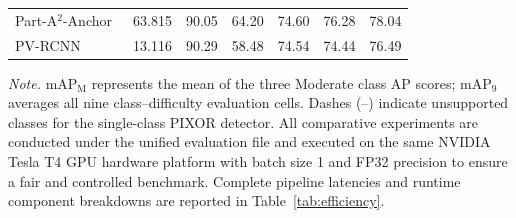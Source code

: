 \begin{table}[t]
\begin{tabular}{@{}lrrrrrr@{}}
Part-A$^2$-Anchor~\cite{shi2020part} & 63.815 & 90.05 & 64.20 & 74.60 & 76.28 & 78.04 \\
PV-RCNN~\cite{shi2020pvrcnn} & 13.116 & 90.29 & 58.48 & 74.54 & 74.44 & 76.49 \\
\bottomrule
\end{tabular}
\par\vspace{2pt}
{\footnotesize \textit{Note.} $\text{mAP}_{\mathrm{M}}$ represents the mean of the three Moderate class AP scores; $\text{mAP}_{9}$ averages all nine class--difficulty evaluation cells. Dashes (--) indicate unsupported classes for the single-class PIXOR detector. All comparative experiments are conducted under the unified evaluation file and executed on the same NVIDIA Tesla T4 GPU hardware platform with batch size 1 and FP32 precision to ensure a fair and controlled benchmark. Complete pipeline latencies and runtime component breakdowns are reported in Table~\ref{tab:efficiency}.}
\end{table}
